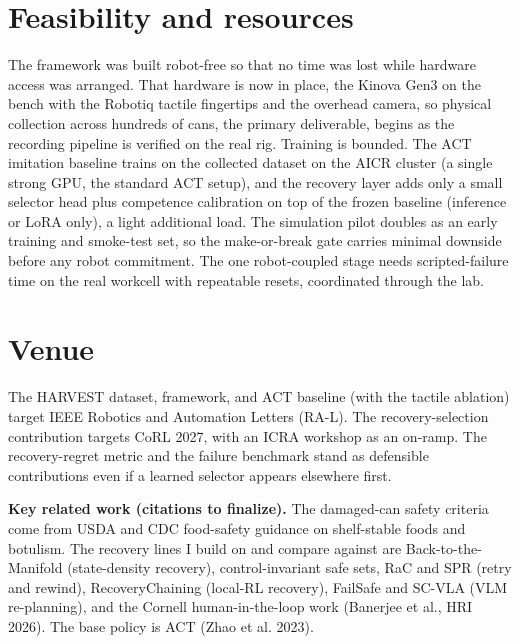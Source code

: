 \documentclass[11pt]{article}
\begin{document}
\section{Feasibility and resources}
The framework was built robot-free so that no time was lost while hardware access was arranged. That hardware is now in place, the Kinova Gen3 on the bench with the Robotiq tactile fingertips and the overhead camera, so physical collection across hundreds of cans, the primary deliverable, begins as the recording pipeline is verified on the real rig. Training is bounded. The ACT imitation baseline trains on the collected dataset on the AICR cluster (a single strong GPU, the standard ACT setup), and the recovery layer adds only a small selector head plus competence calibration on top of the frozen baseline (inference or LoRA only), a light additional load. The simulation pilot doubles as an early training and smoke-test set, so the make-or-break gate carries minimal downside before any robot commitment. The one robot-coupled stage needs scripted-failure time on the real workcell with repeatable resets, coordinated through the lab.

\section{Venue}
The HARVEST dataset, framework, and ACT baseline (with the tactile ablation) target IEEE Robotics and Automation Letters (RA-L). The recovery-selection contribution targets CoRL 2027, with an ICRA workshop as an on-ramp. The recovery-regret metric and the failure benchmark stand as defensible contributions even if a learned selector appears elsewhere first.

\vspace{0.6em}
\noindent\footnotesize\textbf{Key related work (citations to finalize).} The damaged-can safety criteria come from USDA and CDC food-safety guidance on shelf-stable foods and botulism. The recovery lines I build on and compare against are Back-to-the-Manifold (state-density recovery), control-invariant safe sets, RaC and SPR (retry and rewind), RecoveryChaining (local-RL recovery), FailSafe and SC-VLA (VLM re-planning), and the Cornell human-in-the-loop work (Banerjee et al., HRI 2026). The base policy is ACT (Zhao et al. 2023).
\end{document}
